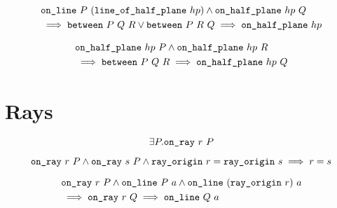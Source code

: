 \begin{equation}\label{eq:betOnHalfPlane1}
  \begin{split}
    &\texttt{on\_line}\ P\ (\texttt{line\_of\_half\_plane}\ hp) \wedge \texttt{on\_half\_plane}\ hp\ Q\\
    &\implies \texttt{between}\ P\ Q\ R \vee \texttt{between}\ P\ R\ Q \implies \texttt{on\_half\_plane}\ hp
  \end{split}
\end{equation}

\begin{equation}\label{eq:betOnHalfPlane2}
  \begin{split}
    &\texttt{on\_half\_plane}\ hp\ P \wedge \texttt{on\_half\_plane}\ hp\ R\\
    &\implies \texttt{between}\ P\ Q\ R \implies \texttt{on\_half\_plane}\ hp\ Q
  \end{split}
\end{equation}

\section{Rays}
\begin{equation}\label{eq:RayNotEmpty}
  \exists P. \texttt{on\_ray}\ r\ P
\end{equation}

\begin{equation}\label{eq:OnRayDisjoint}
    \texttt{on\_ray}\ r\ P \wedge \texttt{on\_ray}\ s\ P\wedge\texttt{ray\_origin}\ r = \texttt{ray\_origin}\ s\implies r = s
\end{equation}

\begin{equation}\label{eq:RayOnLine}
  \begin{split}
    &\texttt{on\_ray}\ r\ P \wedge \texttt{on\_line}\ P\ a \wedge \texttt{on\_line}\ (\texttt{ray\_origin}\ r)\ a\\
    &\implies \texttt{on\_ray}\ r\ Q \implies \texttt{on\_line}\ Q\ a
  \end{split}
\end{equation}

